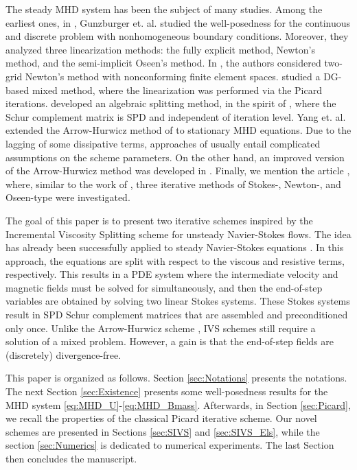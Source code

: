 \documentclass[3p]{elsarticle}
\begin{document}
The steady MHD system has been the subject of many studies. Among the earliest ones, in \cite{Gunzburger1991523}, Gunzburger et. al. studied the well-posedness for the continuous and discrete problem with nonhomogeneous boundary conditions. Moreover, they analyzed three linearization methods: the fully explicit method, Newton's method, and the semi-implicit Oseen's method. In \cite{XU2022105372}, the authors considered two-grid Newton's method with nonconforming finite element spaces. \cite{GREIF20102840} studied a DG-based mixed method, where the linearization was performed via the Picard iterations. \cite{Mengying2021} developed an algebraic splitting method, in the spirit of \cite{rebholz2019efficient}, where the Schur complement matrix is SPD and independent of iteration level. Yang et. al. \cite{YANG2019347} extended the Arrow-Hurwicz method of \cite{chen17} to stationary MHD equations. Due to the lagging of some dissipative terms, approaches of \cite{YANG2019347,chen17}  usually entail complicated assumptions on the scheme parameters. On the other hand, an improved version of the Arrow-Hurwicz method was developed in \cite{TC23,Calcolo2026}. Finally, we mention the article \cite{DONG2014287}, where, similar to the work of \cite{Gunzburger1991523}, three iterative methods of Stokes-, Newton-, and Oseen-type were investigated.

The goal of this paper is to present two iterative schemes inspired by the Incremental Viscosity Splitting scheme for unsteady Navier-Stokes \cite{Yak2023} flows. The idea has already been successfully applied to steady Navier-Stokes equations \cite{SIVS_Takhirov2026}. In this approach, the equations are split with respect to the viscous and resistive terms, respectively. This results in a PDE system where the intermediate velocity and magnetic fields must be solved for simultaneously, and then the end-of-step variables are obtained by solving two linear Stokes systems. These Stokes systems result in SPD Schur complement matrices that are assembled and preconditioned only once. Unlike the Arrow-Hurwicz scheme \cite{TC23}, IVS schemes still require a solution of a mixed problem. However, a gain is that the end-of-step fields are (discretely) divergence-free.

This paper is organized as follows. Section \ref{sec:Notations} presents the notations. The next Section \ref{sec:Existence} presents some well-posedness results for the MHD system \eqref{eq:MHD_U}-\eqref{eq:MHD_Bmass}. Afterwards, in Section \ref{sec:Picard}, we recall the properties of the classical Picard iterative scheme. Our novel schemes are presented in Sections \ref{sec:SIVS} and \ref{sec:SIVS_Els}, while the section \ref{sec:Numerics} is dedicated to numerical experiments. The last Section then concludes the manuscript.
\end{document}
